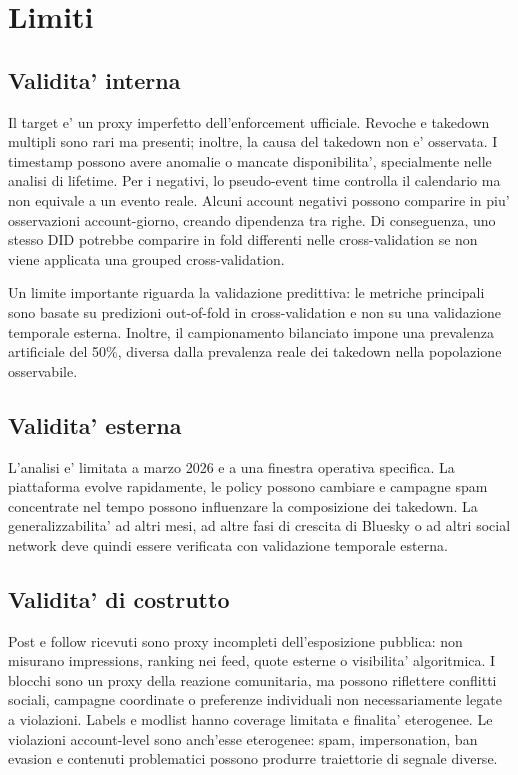 \section{Limiti}

\subsection{Validita' interna}

Il target  e' un proxy imperfetto dell'enforcement ufficiale. Revoche e takedown multipli sono rari ma presenti; inoltre, la causa del takedown non e' osservata. I timestamp  possono avere anomalie o mancate disponibilita', specialmente nelle analisi di lifetime. Per i negativi, lo pseudo-event time controlla il calendario ma non equivale a un evento reale. Alcuni account negativi possono comparire in piu' osservazioni account-giorno, creando dipendenza tra righe. Di conseguenza, uno stesso DID potrebbe comparire in fold differenti nelle cross-validation se non viene applicata una grouped cross-validation.

Un limite importante riguarda la validazione predittiva: le metriche principali sono basate su predizioni out-of-fold in cross-validation e non su una validazione temporale esterna. Inoltre, il campionamento bilanciato impone una prevalenza artificiale del 50\%, diversa dalla prevalenza reale dei takedown nella popolazione osservabile.

\subsection{Validita' esterna}

L'analisi e' limitata a marzo 2026 e a una finestra operativa specifica. La piattaforma evolve rapidamente, le policy possono cambiare e campagne spam concentrate nel tempo possono influenzare la composizione dei takedown. La generalizzabilita' ad altri mesi, ad altre fasi di crescita di Bluesky o ad altri social network deve quindi essere verificata con validazione temporale esterna.

\subsection{Validita' di costrutto}

Post e follow ricevuti sono proxy incompleti dell'esposizione pubblica: non misurano impressions, ranking nei feed, quote esterne o visibilita' algoritmica. I blocchi sono un proxy della reazione comunitaria, ma possono riflettere conflitti sociali, campagne coordinate o preferenze individuali non necessariamente legate a violazioni. Labels e modlist hanno coverage limitata e finalita' eterogenee. Le violazioni account-level sono anch'esse eterogenee: spam, impersonation, ban evasion e contenuti problematici possono produrre traiettorie di segnale diverse.

